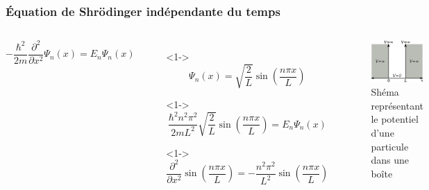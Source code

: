 \documentclass{beamer}
\begin{document}
\begin{frame}
\frametitle{Équation de Shrödinger indépendante du temps}

\begin{columns}

\begin{equation}\tag{4}
-\frac{\hbar^2}{2m}\frac{\partial^2}{\partial x^2}\Psi_n(x)=E_n\Psi_n(x)
\end{equation} 

\begin{itemize}
\item[]<1-> \begin{equation}\tag{5}
\Psi_n(x)=\sqrt{\frac{2}{L}}\sin(\frac{n\pi x}{L})
\end{equation}  
\item[]<1-> \begin{equation}\tag{6}
\frac{\hbar^2n^2\pi^2}{2mL^2}   \sqrt{\frac{2}{L}}  \sin(\frac{n\pi x}{L})=E_n\Psi_n(x)
\end{equation}  

\item[]<1-> \begin{equation}\tag{7}
\frac{\partial^2}{\partial x^2}\sin(\frac{n\pi x}{L})=-\frac{n^2\pi^2}{L^2}\sin(\frac{n\pi x}{L})
\end{equation} 

\end{itemize}
\begin{figure}
\includegraphics[scale=0.4]{Pot}
\caption{Shéma représentant le potentiel d'une particule dans une boîte}
\end{figure}
\end{columns}

\end{frame}
\end{document}
